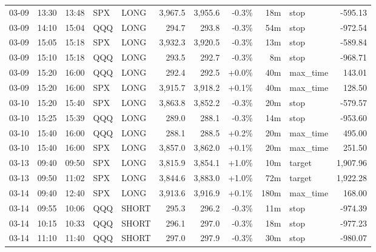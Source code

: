 \documentclass[11pt,a4paper,twoside]{article}
\begin{document}
\begin{center}
\begin{longtable}{>{\color{txtmain}}l l l l l r r r r >{\color{txtmain}}l r}
03-09 & 13:30 & 13:48 & SPX & LONG & 3,967.5 & 3,955.6 & \textcolor{lossred}{-0.3\%} & 18m & stop & \textcolor{lossred}{-595.13} \\
03-09 & 14:10 & 15:04 & QQQ & LONG & 294.7 & 293.8 & \textcolor{lossred}{-0.3\%} & 54m & stop & \textcolor{lossred}{-972.54} \\
03-09 & 15:05 & 15:18 & SPX & LONG & 3,932.3 & 3,920.5 & \textcolor{lossred}{-0.3\%} & 13m & stop & \textcolor{lossred}{-589.84} \\
03-09 & 15:10 & 15:18 & QQQ & LONG & 293.5 & 292.7 & \textcolor{lossred}{-0.3\%} & 8m & stop & \textcolor{lossred}{-968.71} \\
03-09 & 15:20 & 16:00 & QQQ & LONG & 292.4 & 292.5 & \textcolor{wingreen}{+0.0\%} & 40m & max\_time & \textcolor{wingreen}{143.01} \\
03-09 & 15:20 & 16:00 & SPX & LONG & 3,915.7 & 3,918.2 & \textcolor{wingreen}{+0.1\%} & 40m & max\_time & \textcolor{wingreen}{128.50} \\
03-10 & 15:20 & 15:40 & SPX & LONG & 3,863.8 & 3,852.2 & \textcolor{lossred}{-0.3\%} & 20m & stop & \textcolor{lossred}{-579.57} \\
03-10 & 15:25 & 15:39 & QQQ & LONG & 289.0 & 288.1 & \textcolor{lossred}{-0.3\%} & 14m & stop & \textcolor{lossred}{-953.60} \\
03-10 & 15:40 & 16:00 & QQQ & LONG & 288.1 & 288.5 & \textcolor{wingreen}{+0.2\%} & 20m & max\_time & \textcolor{wingreen}{495.00} \\
03-10 & 15:40 & 16:00 & SPX & LONG & 3,857.0 & 3,862.0 & \textcolor{wingreen}{+0.1\%} & 20m & max\_time & \textcolor{wingreen}{251.50} \\
03-13 & 09:40 & 09:50 & SPX & LONG & 3,815.9 & 3,854.1 & \textcolor{wingreen}{+1.0\%} & 10m & target & \textcolor{wingreen}{1,907.96} \\
03-13 & 09:50 & 11:02 & SPX & LONG & 3,844.6 & 3,883.0 & \textcolor{wingreen}{+1.0\%} & 72m & target & \textcolor{wingreen}{1,922.28} \\
03-14 & 09:40 & 12:40 & SPX & LONG & 3,913.6 & 3,916.9 & \textcolor{wingreen}{+0.1\%} & 180m & max\_time & \textcolor{wingreen}{168.00} \\
03-14 & 09:55 & 10:06 & QQQ & SHORT & 295.3 & 296.2 & \textcolor{lossred}{-0.3\%} & 11m & stop & \textcolor{lossred}{-974.39} \\
03-14 & 10:15 & 10:33 & QQQ & SHORT & 296.1 & 297.0 & \textcolor{lossred}{-0.3\%} & 18m & stop & \textcolor{lossred}{-977.23} \\
03-14 & 11:10 & 11:40 & QQQ & SHORT & 297.0 & 297.9 & \textcolor{lossred}{-0.3\%} & 30m & stop & \textcolor{lossred}{-980.07} \\

\end{longtable}
\end{center}
\end{document}
